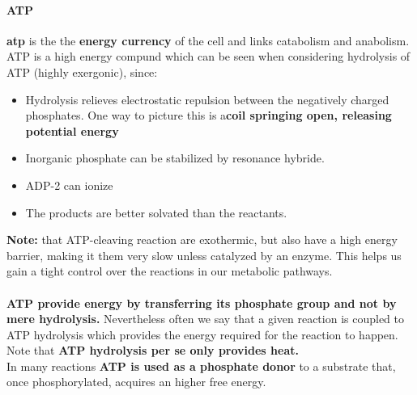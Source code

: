 \documentclass[../main.tex]{subfiles}
\begin{document}
\paragraph{ATP}
\textbf{\gls{atp}} is the the \textbf{energy currency} of the cell and links catabolism and anabolism. ATP is a high energy compund which can be seen when considering hydrolysis of ATP (highly exergonic), since: 
\begin{itemize}
	\item Hydrolysis relieves electrostatic repulsion between the negatively charged phosphates. One way to picture this is a\textbf{coil springing open, releasing potential energy}
	\item Inorganic phosphate can be stabilized by resonance hybride. 
	\item ADP-2 can ionize
	\item The products are better solvated than the reactants. 
\end{itemize} 
\textbf{Note:} that ATP-cleaving reaction are exothermic, but also have a high energy barrier, making it them very slow unless catalyzed by an enzyme. This helps us gain a tight control over the reactions in our metabolic pathways. \\
\\
\textbf{ATP provide energy by transferring its phosphate group and not by mere hydrolysis.} Nevertheless often we say that a given reaction is coupled to ATP hydrolysis which provides the energy required for the reaction to happen. Note that \textbf{ATP hydrolysis per se only provides heat.}\\
In many reactions \textbf{ATP is used as a phosphate donor} to a substrate that, once phosphorylated, acquires an higher free energy. 
\end{document}
